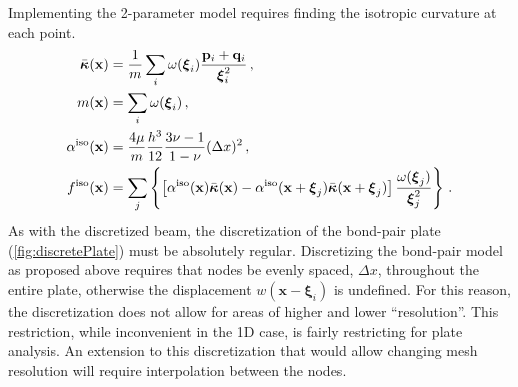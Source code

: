Implementing the 2-parameter model requires finding the isotropic curvature at each point.
%
\begin{align*}
    \bar{\boldsymbol{\kappa}}(\mathbf{x}) &= \frac{1}{m} \sum_i \omega(\boldsymbol{\xi}_i)\frac{\mathbf{p}_i +\mathbf{q}_i }{\boldsymbol{\xi}_i^2}\, ,\notag \\
    m(\mathbf{x})  &= \sum_i \omega(\boldsymbol{\xi}_i)\, , \notag \\
    \alpha^\text{iso}(\mathbf{x}) &= \frac{4\mu}{m}\frac{h^3}{12}\frac{3\nu-1}{1-\nu}(\Delta x)^2\, ,\\
    f^\text{iso}(\mathbf{x}) &= \sum_j \left\{\left[\alpha^\text{iso}(\mathbf{x})\bar{\boldsymbol{\kappa}}(\mathbf{x})-\alpha^\text{iso}(\mathbf{x}+\boldsymbol{\xi}_j)\bar{\boldsymbol{\kappa}}(\mathbf{x}+\boldsymbol{\xi}_j) \right] \frac{\omega(\boldsymbol{\xi}_j)}{\boldsymbol{\xi}_j^2} \right\}\, .
\end{align*}
%
As with the discretized beam, the discretization of the bond-pair plate (\cref{fig:discretePlate}) must be absolutely regular. 
Discretizing the bond-pair model as proposed above requires that nodes be evenly spaced, $\Delta x$, throughout the entire plate, otherwise the displacement \(w(\mathbf{x}-\boldsymbol{\xi}_i)\) is undefined.  For this reason, the discretization does not allow for areas of higher and lower ``resolution''.  This restriction, while inconvenient in the 1D case, is fairly restricting for plate analysis. An extension to this discretization that would allow changing mesh resolution will require interpolation between the nodes.  
%
%
%
%
%  
%
%
